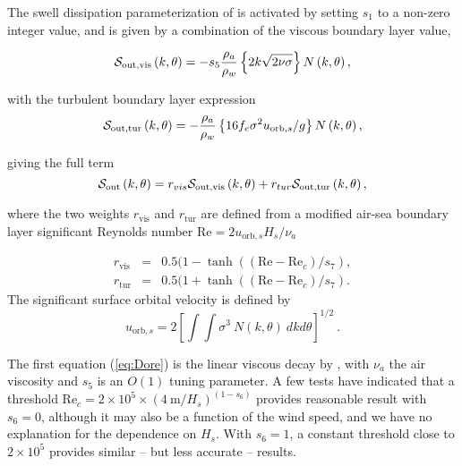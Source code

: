 The swell dissipation parameterization of \cite{art:ACC09} is activated by
setting $s_1$ to a non-zero integer value, and is given by a combination of
the viscous boundary layer value,

\begin{equation}
\cS_{\mathrm{out,vis}}\left(k,\theta\right) = - s_5 \frac{\rho_a}{\rho_w}\left\{ 2 k \sqrt{2
\nu \sigma}\right\}  N \left(k,\theta\right) , \label{eq:Dore}
\end{equation}

\noindent
with the turbulent boundary layer expression 
\begin{equation}
\cS_{\mathrm{out,tur}} \left(k,\theta\right) = - \frac{\rho_a}{\rho_w}\left\{  16 f_e
\sigma^2 u_{\mathrm{orb},s} / g \right\}
 N\left(k,\theta\right),  \label{eq:swell_turb}
\end{equation}

\noindent
giving the full term 
\begin{equation}
\cS_{\mathrm{out}} \left(k,\theta\right) = r_{vis} \cS_{\mathrm{out,vis}}\left(k,\theta\right)  + 
 r_{tur} \cS_{\mathrm{out,tur}}\left(k,\theta\right),  
 \label{eq:swell_comb}
\end{equation}

\noindent
where the two weights $ r_{\mathrm{vis}} $ and $r_{\mathrm{tur}}$ are defined from 
a modified  air-sea boundary layer significant Reynolds number $\mathrm{Re} = 2
u_{\mathrm{orb},s} H_s / \nu_{a}$ 

\begin{eqnarray}
 r_{\mathrm{vis}} &=& 0.5 (1- \tanh((\mathrm{Re}-\mathrm{Re}_{c})/s_7), \\
 r_{\mathrm{tur}}&=& 0.5 (1+ \tanh((\mathrm{Re}-\mathrm{Re}_{c})/s_7) .
\end{eqnarray}
The significant surface orbital velocity is defined by
\begin{equation} u_{\mathrm{orb},s} = 2 \left [  \int \!\!\!\! \int
      \sigma^3 \: N(k,\theta) \: dk d\theta \right ] ^{1/2}
      \: . \label{eq:ub_orbs} \end{equation}

\noindent 
The first equation (\ref{eq:Dore}) is the linear viscous decay by
\cite{art:Dore78}, with $\nu_a$ the air viscosity and $s_5$ is an $O(1)$
tuning parameter. A few tests have indicated that a threshold Re$_{c}=2 \times
10^5 \times (4~\mathrm{m}/H_s)^{(1-s_6)}$ provides reasonable result with
$s_6=0$, although it may also be a function of the wind speed, and we have no
explanation for the dependence on $H_s$.  With $s_6=1$, a constant threshold
close to $2 \times 10^5$ provides similar -- but less accurate -- results.


